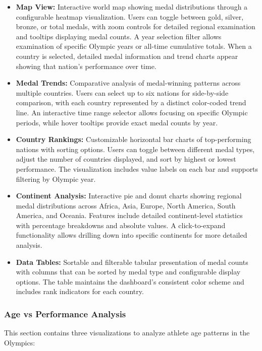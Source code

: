 \documentclass[a4paper, 12pt]{article}
\begin{document}
\begin{itemize}[leftmargin=*]
    \item \textbf{Map View:} Interactive world map showing medal distributions through a configurable heatmap visualization. Users can toggle between gold, silver, bronze, or total medals, with zoom controls for detailed regional examination and tooltips displaying medal counts. A year selection filter allows examination of specific Olympic years or all-time cumulative totals. When a country is selected, detailed medal information and trend charts appear showing that nation's performance over time.
    
    \item \textbf{Medal Trends:} Comparative analysis of medal-winning patterns across multiple countries. Users can select up to six nations for side-by-side comparison, with each country represented by a distinct color-coded trend line. An interactive time range selector allows focusing on specific Olympic periods, while hover tooltips provide exact medal counts by year.
    
    \item \textbf{Country Rankings:} Customizable horizontal bar charts of top-performing nations with sorting options. Users can toggle between different medal types, adjust the number of countries displayed, and sort by highest or lowest performance. The visualization includes value labels on each bar and supports filtering by Olympic year.
    
    \item \textbf{Continent Analysis:} Interactive pie and donut charts showing regional medal distributions across Africa, Asia, Europe, North America, South America, and Oceania. Features include detailed continent-level statistics with percentage breakdowns and absolute values. A click-to-expand functionality allows drilling down into specific continents for more detailed analysis.
    
    \item \textbf{Data Tables:} Sortable and filterable tabular presentation of medal counts with columns that can be sorted by medal type and configurable display options. The table maintains the dashboard's consistent color scheme and includes rank indicators for each country.
\end{itemize}

\subsubsection{Age vs Performance Analysis}
This section contains three visualizations to analyze athlete age patterns in the Olympics:
\end{document}

